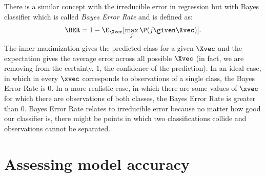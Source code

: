 There is a similar concept with the irreducible error in regression but with Bayes classifier which is called \emph{Bayes Error Rate} and is defined as:
\begin{equation}
    \BER = 1 - \E_{\Xvec}[\max_{j}\P(j \given \Xvec)].
\end{equation}
The inner maximization gives the predicted class for a given $\Xvec$ and the expectation gives the average error across all possible $\Xvec$ (in fact, we are removing from the certainty, $1$, the confidence of the prediction). In an ideal case, in which in every $\xvec$ corresponds to observations of a single class, the Bayes Error Rate is $0$. In a more realistic case, in which there are some values of $\xvec$ for which there are observations of both classes, the Bayes Error Rate is greater than $0$. Bayes Error Rate relates to irreducible error because no matter how good our classifier is, there might be points in which two classifications collide and observations cannot be separated.

\section{Assessing model accuracy}

